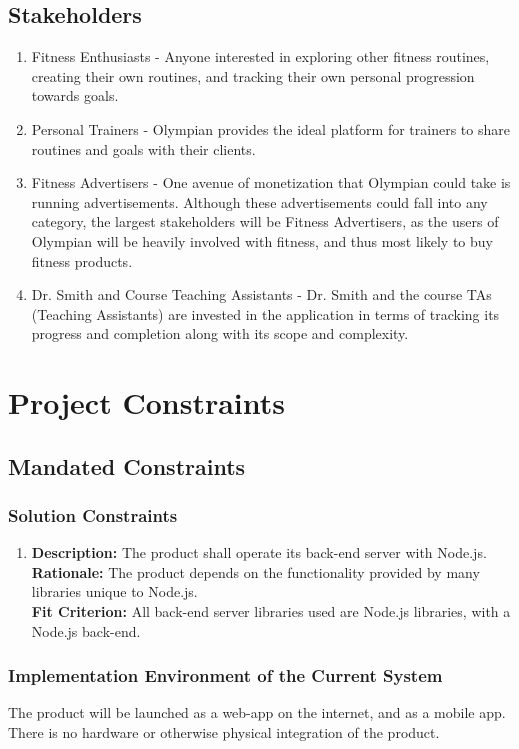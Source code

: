 \documentclass[12pt]{article}
\begin{document}
\subsection{Stakeholders}
\begin{enumerate}
	\item Fitness Enthusiasts - Anyone interested in exploring other fitness routines, creating their own routines, and tracking their own personal progression towards goals.
	\item Personal Trainers - Olympian provides the ideal platform for trainers to share routines and goals with their clients.
	\item Fitness Advertisers - One avenue of monetization that Olympian could take is running advertisements. Although these advertisements could fall into any category, the largest stakeholders will be Fitness Advertisers,
	as the users of Olympian will be heavily involved with fitness, and thus most likely to buy fitness products.
	\item Dr. Smith and Course Teaching Assistants - Dr. Smith and the course TAs (Teaching Assistants) are invested in the application in terms of tracking its progress and completion along with its scope and complexity.
\end{enumerate} 

\section{Project Constraints}
\subsection{Mandated Constraints} 
\subsubsection{Solution Constraints}
\begin{enumerate}
	\item
	\textbf{Description: } The product shall operate its back-end server with Node.js. \\
	\textbf{Rationale: } The product depends on the functionality provided by many libraries unique to Node.js. \\
	\textbf{Fit Criterion: } All back-end server libraries used are Node.js libraries, with a Node.js back-end. \\
\end{enumerate}
\subsubsection{Implementation Environment of the Current System}
The product will be launched as a web-app on the internet, and as a mobile app. There is no hardware or otherwise physical integration of the product.
\end{document}

